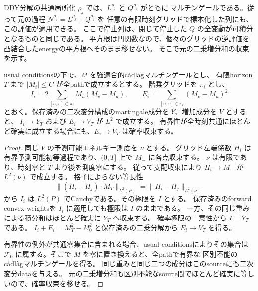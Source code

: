 DDY分解の共通局所化 $\rho_j$ では、$L^{\rho_j}$ と $Q^{\rho_j}$ がともに
マルチンゲールである。従って元の過程 $N^{\rho_j}=L^{\rho_j}+Q^{\rho_j}$ を
任意の有限時刻グリッドで標本化した列にも、この評価が適用できる。
ここで停止列は、閉じて停止した $Q$ の全変動が可積分となるものと同じである。
平方根は凹関数なので、個々のグリッドの逆評価を凸結合したenergyの平方根へそのまま移せない。
そこで元の二乗増分和の収束を示す。

\begin{lemma}[有界マルチンゲールの元の二乗増分和]
usual conditionsの下で、$M$ を強適合的c\`adl\`agマルチンゲールとし、
有限horizon $T$ まで $|M_t|\le C$ が全pathで成立するとする。
階乗グリッドを $\pi_i$ とし、
\[
 I_i=2\sum_{[u,v]\in\pi_i}M_u(M_v-M_u),\qquad
 E_i=\sum_{[u,v]\in\pi_i}(M_v-M_u)^2
\]
とおく。保存済みの二次変分構成のmartingale成分を $Y$、増加成分を $V$ とすると、
$I_i\to Y_T$ および $E_i\to V_T$ が $L^2$ で成立する。
有界性が全時刻共通にほとんど確実に成立する場合にも、$E_i\to V_T$ は確率収束する。
\end{lemma}
\begin{proof}
同じ $V$ の予測可能エネルギー測度を $\nu$ とする。
グリッド左端係数 $H_i$ は有界予測可能初等過程であり、$(0,T]$ 上で $M_-$ に各点収束する。
$\nu$ は有限であり、時刻零と $T$ より後を測度零にする。
従って支配収束により $H_i\to M_-$ が $L^2(\nu)$ で成立する。
格子によらない等長性
\[
 \|(H_i-H_j)\mathbin{\cdot}M_T\|_{L^2(P)}
 =\|H_i-H_j\|_{L^2(\nu)}
\]
から $I_i$ は $L^2(P)$ でCauchyである。その極限を $I$ とする。
保存済みのforward convex weightsを $I_i$ に適用しても極限は $I$ のままである。
一方、その同じ重みによる積分和はほとんど確実に $Y_T$ へ収束する。
確率極限の一意性から $I=Y_T$ である。
$I_i+E_i=M_T^2-M_0^2$ と保存済みの二乗分解から $E_i\to V_T$ を得る。

有界性の例外が共通零集合に含まれる場合、usual conditionsによりその集合は
$\mathcal F_0$ に属する。そこで $M$ を零に置き換えると、全pathで有界な
区別不能のc\`adl\`agマルチンゲールを得る。
同じ重みと同じ二つの成分はこのsourceにも二次変分dataを与える。
元の二乗増分和も区別不能なsource間でほとんど確実に等しいので、確率収束を移せる。
\end{proof}

